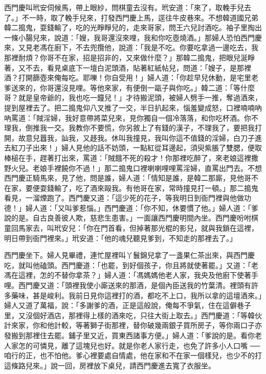 西門慶叫玳安伺候馬，帶上眼紗，問棋童去沒有。玳安道：「來了，取輓手兒去了。」不一時，取了輓手兒來，打發西門慶上馬，逕往牛皮巷來。不想韓道國兄弟韓二搗鬼，耍錢輸了，吃的光睜睜兒的，走來哥家，問王六兒討酒吃。袖子里掏出一條小腸兒來，說道：「嫂，我哥還沒來哩，我和你吃壺燒酒。」那婦人恐怕西門慶來，又見老馮在廚下，不去兜攬他，說道：「我是不吃。你要吃拿過一邊吃去，我那裡耐煩？你哥不在家，招是招非的，又來做什麼？」那韓二搗鬼，把眼兒涎睜著，又不去，看見桌底下一壇白泥頭酒，貼著紅紙帖兒，問道：「嫂子，是那裡酒？打開篩壺來俺每吃。耶嚛！你自受用！」婦人道：「你趁早兒休動，是宅里老爹送來的，你哥還沒見哩。等他來家，有便倒一甌子與你吃。」韓二道：「等什麼哥？就是皇帝爺的，我也吃一鐘兒！」才待搬泥頭，被婦人劈手一推，奪過酒來，提到屋裡去了。把二搗鬼仰八叉推了一交，半日扒起來，惱羞變成怒，口裡喃喃吶吶罵道：「賊淫婦，我好意帶將菜兒來，見你獨自一個冷落落，和你吃杯酒。你不理我，倒推我一交。我教你不要慌，你另敘上了有錢的漢子，不理我了，要把我打開，故意兒囂我，訕我，又趍我。休叫我撞見，我叫你這不值錢的淫婦，白刀子進去紅刀子出來！」婦人見他的話不妨頭，一點紅從耳邊起，須臾紫脹了雙腮，便取棒槌在手，趕著打出來，罵道：「賊餓不死的殺才！你那裡吃醉了，來老娘這裡撒野火兒。老娘手裡饒你不過！」那二搗鬼口裡喇喇哩哩罵淫婦，直罵出門去。不想西門慶正騎馬來，見了他，問是誰，婦人道：「情知是誰，是韓二那廝，見他哥不在家，要便耍錢輸了，吃了酒來毆我。有他哥在家，常時撞見打一頓。」那二搗鬼看見，一溜煙跑了。西門慶又道：「這少死的花子，等我明日到衙門裡與他做功德！」婦人道：「又叫爹惹惱。」西門慶道：「你不知，休要慣了他。」婦人道：「爹說的是。自古良善彼人欺，慈悲生患害。」一面讓西門慶明間內坐。西門慶吩咐棋童回馬家去，叫玳安兒：「你在門首看，但掉著那光棍的影兒，就與我鎖在這裡，明日帶到衙門裡來。」玳安道：「他的魂兒聽見爹到，不知走的那裡去了。」

西門慶坐下。婦人見畢禮，連忙屋裡叫丫鬟錦兒拿了一盞果仁茶出來，與西門慶吃，就叫他磕頭。西門慶道：「也罷，到好個孩子，你且將就使著罷。」又道：「老馮在這裡，怎的不替你拿茶？」婦人道：「馮媽媽他老人家，我央及他廚下使著手哩。西門慶又道：「頭裡我使小廝送來的那酒，是個內臣送我的竹葉清。裡頭有許多藥味，甚是峻利。我前日見你這裡打的酒，都吃不上口，我所以拿的這壇酒來。」婦人又道了萬福，說：「多謝爹的酒，正是這般說，俺每不爭氣，住在這僻巷子里，又沒個好酒店，那裡得上樣的酒來吃，只往大街上取去。」西門慶道：「等韓伙計來家，你和他計較，等著獅子街那裡，替你破幾兩銀子買所房子，等你兩口子亦發搬到那裡住去罷。鋪子里又近，買東西諸事方便。」婦人道：「爹說的是。看你老人家怎的可憐見，離了這塊兒也好。就是你老人家行走，也免了許多小人口嘴 ──咱行的正，也不怕他。爹心裡要處自情處，他在家和不在家一個樣兒，也少不的打這條路兒來。」說一回，房裡放下桌兒，請西門慶進去寬了衣服坐。

